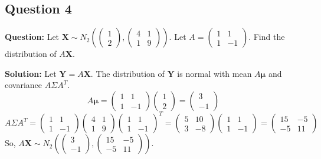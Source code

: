 \subsection*{Question 4}
\textbf{Question:} Let $\mathbf{X} \sim N_2\left(\begin{pmatrix} 1 \\ 2 \end{pmatrix}, \begin{pmatrix} 4 & 1 \\ 1 & 9 \end{pmatrix}\right)$. Let $A = \begin{pmatrix} 1 & 1 \\ 1 & -1 \end{pmatrix}$. Find the distribution of $A\mathbf{X}$.

\textbf{Solution:}
Let $\mathbf{Y} = A\mathbf{X}$. The distribution of $\mathbf{Y}$ is normal with mean $A\boldsymbol{\mu}$ and covariance $A\Sigma A^T$.
$$ A\boldsymbol{\mu} = \begin{pmatrix} 1 & 1 \\ 1 & -1 \end{pmatrix} \begin{pmatrix} 1 \\ 2 \end{pmatrix} = \begin{pmatrix} 3 \\ -1 \end{pmatrix} $$
$$ A\Sigma A^T = \begin{pmatrix} 1 & 1 \\ 1 & -1 \end{pmatrix} \begin{pmatrix} 4 & 1 \\ 1 & 9 \end{pmatrix} \begin{pmatrix} 1 & 1 \\ 1 & -1 \end{pmatrix}^T = \begin{pmatrix} 5 & 10 \\ 3 & -8 \end{pmatrix} \begin{pmatrix} 1 & 1 \\ 1 & -1 \end{pmatrix} = \begin{pmatrix} 15 & -5 \\ -5 & 11 \end{pmatrix} $$
So, $A\mathbf{X} \sim N_2\left(\begin{pmatrix} 3 \\ -1 \end{pmatrix}, \begin{pmatrix} 15 & -5 \\ -5 & 11 \end{pmatrix}\right)$.

